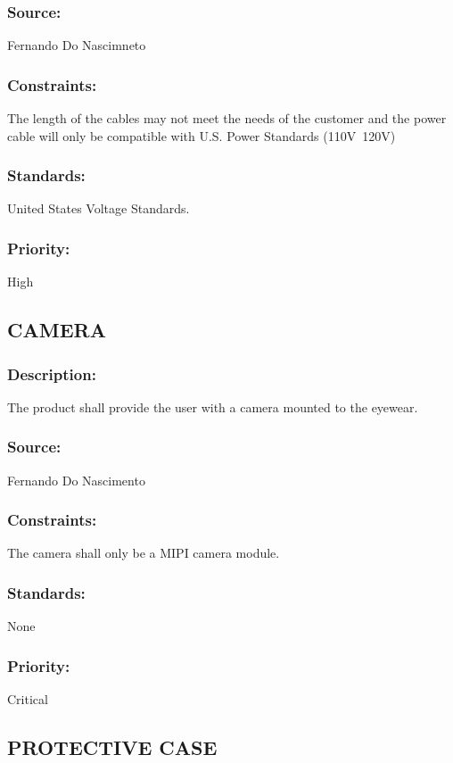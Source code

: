\subsubsection{Source:} 
	{Fernando Do Nascimneto}
\subsubsection{Constraints:} 
	{The length of the cables may not meet the needs of the customer and the power cable will only be compatible with U.S. Power Standards (110V~120V)}
\subsubsection{Standards:} 
	{United States Voltage Standards.}
\subsubsection{Priority:} 
	{High}
\newline
	
\subsection{\text CAMERA}
\subsubsection{Description:} 
	{The product shall provide the user with a camera mounted to the eyewear.}
\subsubsection{Source:} 
	{Fernando Do Nascimento}
\subsubsection{Constraints:} 
	{The camera shall only be a MIPI camera module.}
\subsubsection{Standards:} 
	{None}
\subsubsection{Priority:} 
	{Critical}
\newline
	
\subsection{\text PROTECTIVE CASE }
